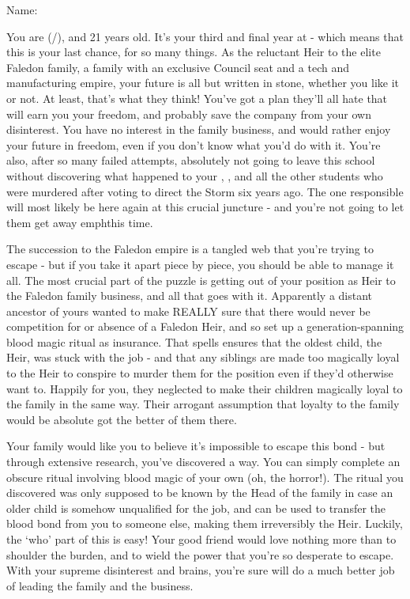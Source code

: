 \documentclass[char]{GL2020}
\begin{document}
\name{\cHeir{}}


Name:  \cHeir{}

You are \cHeir{} (\cHeir{\they}/\cHeir{\them}), and 21 years old.  It’s your third and final year at \pSchool{} - which means that this is your last chance, for so many things.  As the reluctant Heir to the elite Faledon family, a family with an exclusive Council seat and a tech and manufacturing empire, your future is all but written in stone, whether you like it or not. At least, that’s what they think! You’ve got a plan they’ll all hate that will earn you your freedom, and probably save the company from your own disinterest.  You have no interest in the family business, and would rather enjoy your future in freedom, even if you don’t know what you’d do with it. You’re also, after so many failed attempts, absolutely not going to leave this school without discovering what happened to your , \cHeirSibling{}, and all the other students who were murdered after voting to direct the Storm six years ago. The one responsible will most likely be here again at this crucial juncture - and you’re not going to let them get away emph{this} time.

The succession to the Faledon empire is a tangled web that you’re trying to escape - but if you take it apart piece by piece, you should be able to manage it all. The most crucial part of the puzzle is getting out of your position as Heir to the Faledon family business, and all that goes with it. Apparently a distant ancestor of yours wanted to make REALLY sure that there would never be competition for or absence of a Faledon Heir, and so set up a generation-spanning blood magic ritual as insurance. That spells ensures that the oldest child, the Heir, was stuck with the job - and that any siblings are made too magically loyal to the Heir to conspire to murder them for the position even if they’d otherwise want to. Happily for you, they neglected to make their children magically loyal to the family in the same way. Their arrogant assumption that loyalty to the family would be absolute got the better of them there.

Your family would like you to believe it’s impossible to escape this bond - but through extensive research, you’ve discovered a way. You can simply complete an obscure ritual involving blood magic of your own (oh, the horror!). The ritual you discovered was only supposed to be known by the Head of the family in case an older child is somehow unqualified for the job, and can be used to transfer the blood bond from you to someone else, making them irreversibly the Heir. Luckily, the ‘who’ part of this is easy!  Your good friend \cAmbition{} would love nothing more than to shoulder the burden, and to wield the power that you’re so desperate to escape. With your supreme disinterest and \cAmbition{\their} brains, you’re sure \cAmbition{\they} will do a much better job of leading the family and the business.  
\end{document}

